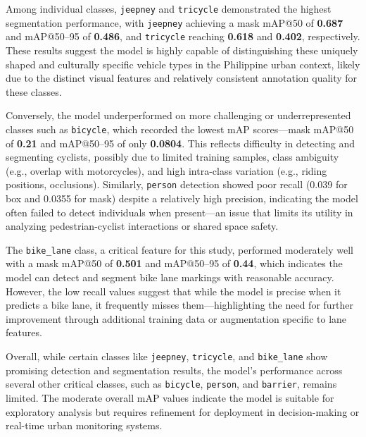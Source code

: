 Among individual classes, \texttt{jeepney} and \texttt{tricycle} demonstrated the highest segmentation performance, with \texttt{jeepney} achieving a mask mAP@50 of \textbf{0.687} and mAP@50–95 of \textbf{0.486}, and \texttt{tricycle} reaching \textbf{0.618} and \textbf{0.402}, respectively. These results suggest the model is highly capable of distinguishing these uniquely shaped and culturally specific vehicle types in the Philippine urban context, likely due to the distinct visual features and relatively consistent annotation quality for these classes.

Conversely, the model underperformed on more challenging or underrepresented classes such as \texttt{bicycle}, which recorded the lowest mAP scores—mask mAP@50 of \textbf{0.21} and mAP@50–95 of only \textbf{0.0804}. This reflects difficulty in detecting and segmenting cyclists, possibly due to limited training samples, class ambiguity (e.g., overlap with motorcycles), and high intra-class variation (e.g., riding positions, occlusions). Similarly, \texttt{person} detection showed poor recall (0.039 for box and 0.0355 for mask) despite a relatively high precision, indicating the model often failed to detect individuals when present—an issue that limits its utility in analyzing pedestrian-cyclist interactions or shared space safety.

The \texttt{bike\_lane} class, a critical feature for this study, performed moderately well with a mask mAP@50 of \textbf{0.501} and mAP@50–95 of \textbf{0.44}, which indicates the model can detect and segment bike lane markings with reasonable accuracy. However, the low recall values suggest that while the model is precise when it predicts a bike lane, it frequently misses them—highlighting the need for further improvement through additional training data or augmentation specific to lane features.

Overall, while certain classes like \texttt{jeepney}, \texttt{tricycle}, and \texttt{bike\_lane} show promising detection and segmentation results, the model's performance across several other critical classes, such as \texttt{bicycle}, \texttt{person}, and \texttt{barrier}, remains limited. The moderate overall mAP values indicate the model is suitable for exploratory analysis but requires refinement for deployment in decision-making or real-time urban monitoring systems.

